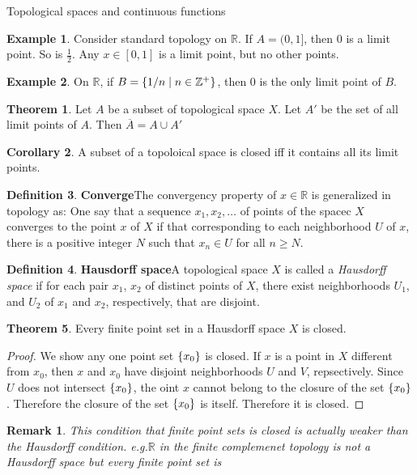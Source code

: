 \documentclass{report}
\newtheorem*{remark}{Remark}
\theoremstyle{definition}
\newtheorem{theorem}{Theorem}[chapter]
\newtheorem{definition}[theorem]{Definition}
\newtheorem{example}{Example}[theorem]
\newtheorem{corollary}[theorem]{Corollary}
\newcommand{\defn}[1]{\textbf{#1}\label{#1}\index{#1}}
\newcommand{\set}[1]{\ensuremath\left\{#1\right\}}
\newcommand{\eg}{\textit{e.g.}\xspace}
\newcommand{\ZZ}{\mathbb{Z}}
\newcommand{\RR}{\mathbb{R}}
\newcommand{\union}{\cup}
\newcommand{\closure}[1]{\overline{#1}}
\begin{document}
\begin{chapter}{Topological spaces and continuous functions}
\begin{example}
    Consider standard topology on $\RR$. If $A=(0,1]$, then $0$ is a
    limit point. So is $\frac{1}{2}$. Any $x\in[0,1]$ is a limit
    point, but no other points.
  \end{example}
  \begin{example}
    On $\RR$, if $B=\set{1/n\mid n\in\ZZ^+}$, then $0$ is the only
    limit point of $B$.
  \end{example}
  \begin{theorem}
    Let $A$ be a subset of topological space $X$. Let $A'$ be the set
    of all limit points of $A$. Then
    $\closure{A}=A\union A'$
  \end{theorem}
  \begin{corollary}
    A subset of a topoloical space is closed iff it contains all its
    limit points.
  \end{corollary}
  \begin{definition}\defn{Converge}
    The convergency property of $x\in\RR$ is generalized in topology
    as:
    One say that a sequence $x_1,x_2,\ldots$ of points of the spacec
    $X$ converges to the point $x$ of $X$ if that corresponding to
    each neighborhood $U$ of $x$, there is a positive integer $N$ such
    that $x_n\in U$ for all $n\geq N$.
  \end{definition}
  \begin{definition}\defn{Hausdorff space}
    A topological space $X$ is called a \emph{Hausdorff space} if for
    each pair $x_1$, $x_2$ of distinct points of $X$, there exist
    neighborhoods $U_1$, and $U_2$ of $x_1$ and $x_2$, respectively,
    that are disjoint.
  \end{definition}
  \begin{theorem}
    Every finite point set in a Hausdorff space $X$ is closed.
  \end{theorem}
  \begin{proof}
    We show any one point set $\set{x_0}$ is closed. If $x$ is a point
    in $X$ different from $x_0$, then $x$ and $x_0$ have disjoint
    neighborhoods $U$ and $V$, repsectively. Since $U$ does not
    intersect $\set{x_0}$, the oint $x$ cannot belong to the closure
    of the set $\set{x_0}$. Therefore the closure of the set
    $\set{x_0}$ is itself. Therefore it is closed.
  \end{proof}
  \begin{remark}
    This condition that finite point sets is closed is actually weaker
    than the Hausdorff condition. \eg $\RR$ in the finite complemenet
    topology is not a Hausdorff space but every finite point set is

\end{remark}
\end{chapter}
\end{document}
